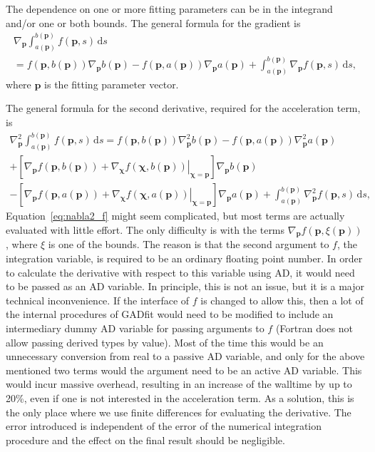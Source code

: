 \documentclass{article}
\newcommand{\D}{\,\textrm{d}}
\begin{document}
The dependence on one or more fitting parameters can be in the integrand and/or one or both bounds. The general formula for the gradient is
\begin{multline}
  \label{eq:grad_f}
  \nabla_{\bm p} \int_{a(\bm p)}^{b(\bm p)} f(\bm p, s) \D s \\
  = f(\bm p, b(\bm p)) \nabla_{\bm p} b(\bm p) - f(\bm p, a(\bm p))
  \nabla_{\bm p} a(\bm p) + \int_{a(\bm p)}^{b(\bm p)} \nabla_{\bm p}
  f(\bm p, s) \D s,
\end{multline}
where $\bm p$ is the fitting parameter vector.

The general formula for the second derivative, required for the acceleration term, is
\begin{multline}
  \label{eq:nabla2_f}
  \nabla_{\bm p}^2 \int_{a(\bm p)}^{b(\bm p)} f(\bm p,s) \D s = f(\bm
  p,b(\bm p)) \nabla_{\bm p}^2 b(\bm p) - f(\bm p,a(\bm p))
  \nabla_{\bm p}^2 a(\bm p) \\
  + \left[ \nabla_{\bm p} f(\bm p,b(\bm p)) + \left. \nabla_{\bm\chi}
      f(\bm\chi,b(\bm p)) \right|_{\bm\chi=\bm p} \right] \nabla_{\bm
    p} b(\bm p) \\
  - \left[ \nabla_{\bm p} f(\bm p,a(\bm p)) + \left. \nabla_{\bm\chi}
      f(\bm\chi,a(\bm p)) \right|_{\bm\chi=\bm p} \right] \nabla_{\bm
    p} a(\bm p) + \int_{a(\bm p)}^{b(\bm p)} \nabla_{\bm p}^2 f(\bm p,s)
  \D s,
\end{multline}
Equation~\eqref{eq:nabla2_f} might seem complicated, but most terms are actually evaluated with little effort. The only difficulty is with the terms $\nabla_{\bm p} f(\bm p,\xi(\bm p))$, where $\xi$ is one of the bounds. The reason is that the second argument to $f$, the integration variable, is required to be an ordinary floating point number. In order to calculate the derivative with respect to this variable using AD, it would need to be passed as an AD variable. In principle, this is not an issue, but it is a major technical inconvenience. If the interface of $f$ is changed to allow this, then a lot of the internal procedures of GADfit would need to be modified to include an intermediary dummy AD variable for passing arguments to $f$ (Fortran does not allow passing derived types by value). Most of the time this would be an unnecessary conversion from real to a passive AD variable, and only for the above mentioned two terms would the argument need to be an active AD variable. This would incur massive overhead, resulting in an increase of the walltime by up to 20\%, even if one is not interested in the acceleration term. As a solution, this is the only place where we use finite differences for evaluating the derivative. The error introduced is independent of the error of the numerical integration procedure and the effect on the final result should be negligible.
\end{document}
